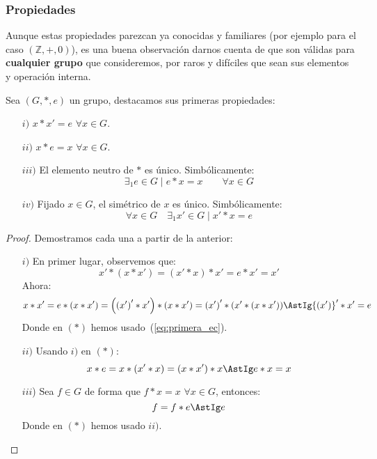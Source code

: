 \subsubsection{Propiedades}
Aunque estas propiedades parezcan ya conocidas y familiares (por ejemplo para el caso $(\mathbb{Z},+,0)$), es una buena observación darnos cuenta de que son válidas para \textbf{cualquier grupo} que consideremos, por raros y difíciles que sean sus elementos y operación interna.

\begin{prop}
    Sea $(G,\ast,e)$ un grupo, destacamos sus primeras propiedades:
    \begin{enumerate}
        \item[$i)$] $x\ast x' = e$ $\forall x\in G$.
        \item[$ii)$] $x\ast e = x$ $\forall x\in G$.
        \item[$iii)$] El elemento neutro de $\ast$ es único. Simbólicamente:
            \begin{equation*}
                \exists_1 e\in G \mid e\ast x = x \qquad \forall x\in G
            \end{equation*}
        \item[$iv)$] Fijado $x\in G$, el simétrico de $x$ es único. Simbólicamente:
            \begin{equation*}
                \forall x\in G \quad \exists_1 x' \in G \mid x' \ast x = e
            \end{equation*}
    \end{enumerate}
    \begin{proof}
        Demostramos cada una a partir de la anterior:
        \begin{enumerate}
            \item[$i)$] En primer lugar, observemos que:
                \begin{equation}\label{eq:primera_ec}
                    x'\ast (x\ast x') = (x'\ast x) \ast x' = e \ast x' = x'
                \end{equation}
                Ahora:
                \begin{equation*}
                    x\ast x' = e\ast (x \ast x') = \left({(x')}'\ast x'\right) \ast (x\ast x') = {(x')}' \ast (x'\ast (x\ast x')) \AstIg {(x')}' \ast x' = e
                \end{equation*}
                Donde en $(\ast)$ hemos usado~(\ref{eq:primera_ec}).
            \item[$ii)$] Usando $i)$ en $(\ast)$:
                \begin{equation*}
                    x\ast e = x\ast (x' \ast x) = (x \ast x') \ast x \AstIg e \ast x = x
                \end{equation*}
            \item[$iii$)] Sea $f\in G$ de forma que $f\ast x = x$ $\forall x\in G$, entonces:
                \begin{equation*}
                    f = f \ast e \AstIg e
                \end{equation*}
                Donde en $(\ast)$ hemos usado $ii)$.


\end{enumerate}
\end{proof}
\end{prop}
